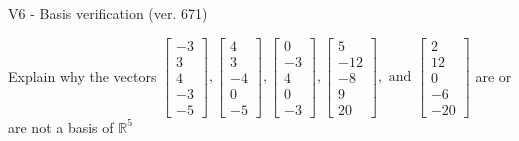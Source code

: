 \begin{exercise}
  \begin{exerciseTitle}V6 - Basis verification (ver. 671)\end{exerciseTitle}
  \begin{exerciseStatement}
    Explain why the vectors \(\left[\begin{array}{r}
-3 \\
3 \\
4 \\
-3 \\
-5
\end{array}\right] , \left[\begin{array}{r}
4 \\
3 \\
-4 \\
0 \\
-5
\end{array}\right] , \left[\begin{array}{r}
0 \\
-3 \\
4 \\
0 \\
-3
\end{array}\right] , \left[\begin{array}{r}
5 \\
-12 \\
-8 \\
9 \\
20
\end{array}\right] , \text{ and } \left[\begin{array}{r}
2 \\
12 \\
0 \\
-6 \\
-20
\end{array}\right]\) are or are not a basis of \(\mathbb{R}^5\)	



\end{exerciseStatement}
\end{exercise}
